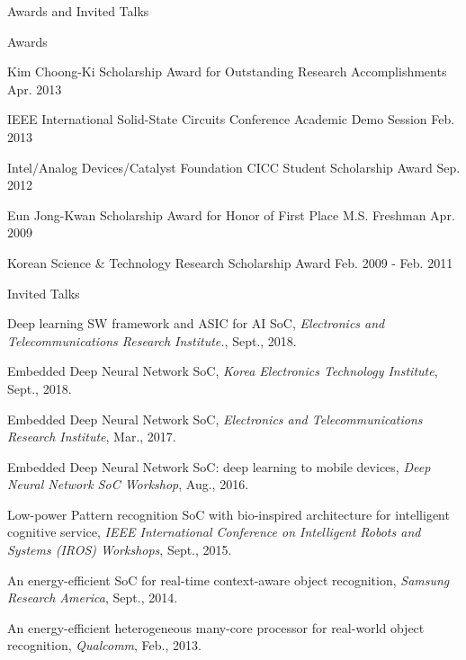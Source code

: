 \documentclass{resume} %
\begin{document}
\begin{section}{Awards and Invited Talks}

\begin{subsection}{Awards}{}{}{}
\item Kim Choong-Ki Scholarship Award for Outstanding Research Accomplishments \hfill Apr. 2013
\item IEEE International Solid-State Circuits Conference Academic Demo Session \hfill Feb. 2013
\item Intel/Analog Devices/Catalyst Foundation CICC Student Scholarship Award \hfill Sep. 2012
\item Eun Jong-Kwan Scholarship Award for Honor of First Place M.S. Freshman \hfill Apr. 2009
\item Korean Science \& Technology Research Scholarship Award \hfill Feb. 2009 - Feb. 2011
\end{subsection}

\begin{subsection}{Invited Talks}{}{}{}

\item Deep learning SW framework and ASIC for AI SoC,
{\small\textit{Electronics and Telecommunications Research Institute.}, Sept., 2018.}

\item Embedded Deep Neural Network SoC,
{\small\textit{Korea Electronics Technology Institute}, Sept., 2018.}

\item Embedded Deep Neural Network SoC,
{\small\textit{Electronics and Telecommunications Research Institute}, Mar., 2017.}

\item Embedded Deep Neural Network SoC:  deep learning to mobile devices,
{\small\textit{Deep Neural Network SoC Workshop}, Aug., 2016.}

\item Low-power Pattern recognition SoC with bio-inspired architecture for intelligent cognitive service,
{\small\textit{IEEE International Conference on Intelligent Robots and Systems (IROS) Workshops}, Sept., 2015.}

\item An energy-efficient SoC for real-time context-aware object recognition,
{\small\textit{Samsung Research America}, Sept., 2014.}

\item An energy-efficient heterogeneous many-core processor for real-world object recognition,
{\small\textit{Qualcomm}, Feb., 2013.}

\end{subsection}

\end{section}
\end{document}
